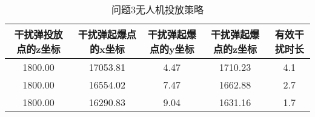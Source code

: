 \documentclass[../main.tex]{subfiles}
\begin{document}
\begin{table}[H]
\caption{问题3无人机投放策略}
\label{tab:031} 
\centering
\begin{small}
\begin{tabular}{ccccc}
\toprule[1.5pt]
    干扰弹投放点的z坐标 &干扰弹起爆点的x坐标&干扰弹起爆点的y坐标&干扰弹起爆点的z坐标&有效干扰时长\\
\midrule[1pt]
1800.00             &17053.81                   & 4.47    &1710.23        & 4.1  \\               
1800.00             &16554.02                   & 7.47    & 1662.88       & 2.7  \\               
1800.00             &16290.83                   & 9.04    & 1631.16       & 1.7  \\                
\bottomrule[1.5pt]
\end{tabular}
\end{small}
\end{table}
\end{document}
